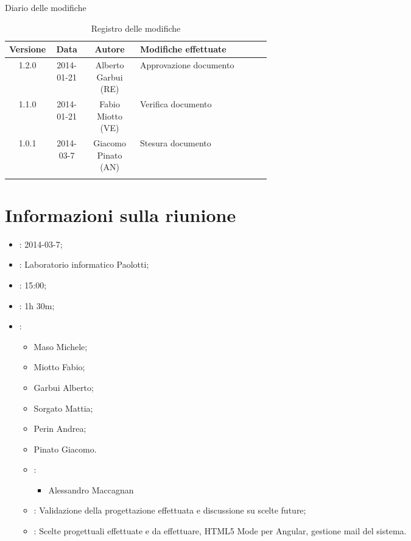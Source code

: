 
\newpage
Diario delle modifiche
\begin{center}
\begin{longtable}{|c|c|c|p{0.5\linewidth}|}
\toprule
\textbf{Versione} & \textbf{Data} & \textbf{Autore} & \textbf{Modifiche effettuate}\\

\midrule
1.2.0 & 2014-01-21 & Alberto Garbui (RE)  & Approvazione documento\\
\midrule
1.1.0 & 2014-01-21 & Fabio Miotto (VE) & Verifica documento\\
\midrule
1.0.1 & 2014-03-7 & Giacomo Pinato (AN) & Stesura documento\\

\bottomrule
\caption{Registro delle modifiche}
\label{tab:changelog}
\end{longtable}
\end{center}

\newpage
\tableofcontents


\newpage
\section{Informazioni sulla riunione}%
\label{1.0}
\begin{itemize}
\item {}: 2014-03-7;
\item {}: Laboratorio informatico Paolotti;
\item {}: 15:00;
\item {}: 1h 30m;
\item {}: \NomeGruppo{}
\begin{itemize}
\item Maso Michele;
\item Miotto Fabio;
\item Garbui Alberto;
\item Sorgato Mattia;
\item Perin Andrea;
\item Pinato Giacomo.
\item {}:
\begin{itemize}
\item Alessandro Maccagnan
\end{itemize}
\item {}: Validazione della progettazione effettuata e discussione su scelte future;
\item {}: Scelte progettuali effettuate e da effettuare, HTML5 Mode per Angular, gestione mail del sistema.
\end{itemize}
\end{itemize}

